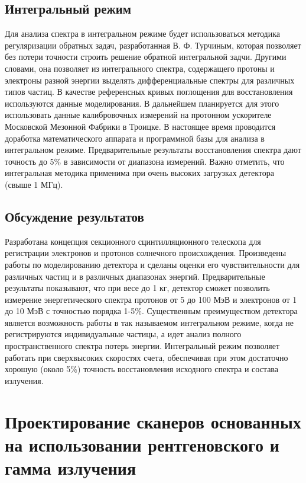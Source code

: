 \subsection{Интегральный режим}
Для анализа спектра в интегральном режиме будет использоваться методика регуляризации обратных задач, разработанная В. Ф. Турчиным, которая позволяет без потери точности строить решение обратной интегральной задчи. Другими словами, она позволяет из интегрального спектра, содержащего протоны и электроны разной энергии выделять дифференциальные спектры для различных типов частиц. В качестве референсных кривых поглощения для восстановления используются данные моделирования. В дальнейшем планируется для этого использовать данные калибровочных измерений на протонном ускорителе Московской Мезонной Фабрики в Троицке.
В настоящее время проводится доработка математического аппарата и программной базы для анализа в интегральном режиме. Предварительные результаты восстановления спектра дают точность до 5\% в зависимости от диапазона измерений. Важно отметить, что интегральная методика применима при очень высоких загрузках детектора (свыше 1 МГц).
\subsection{Обсуждение результатов}
Разработана концепция секционного сцинтилляционного телескопа для регистрации электронов и протонов солнечного происхождения. Произведены работы по моделированию детектора и сделаны оценки его чувствительности для различных частиц и в различных диапазонах энергий. Предварительные результаты показывают, что при весе до 1 кг, детектор сможет позволить измерение энергетического спектра протонов от 5 до 100 МэВ и электронов от 1 до 10 МэВ с точностью порядка 1-5\%.
Существенным преимуществом детектора является возможность работы в так называемом интегральном режиме, когда не регистрируются индивидуальные частицы, а идет анализ полного пространственного спектра потерь энергии. Интегральный режим позволяет работать при сверхвысоких скоростях счета, обеспечивая при этом достаточно хорошую (около 5\%) точность восстановления исходного спектра и состава излучения.



\section{Проектирование сканеров основанных на использовании рентгеновского и гамма излучения
}\label{sec:detectors/scanners}

